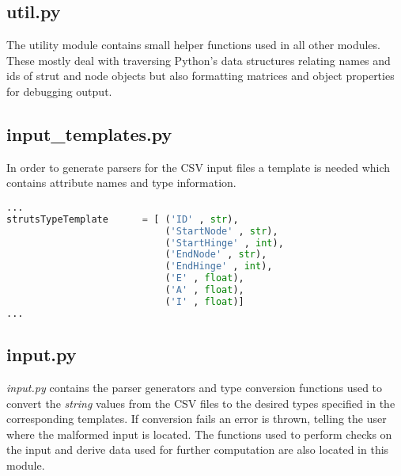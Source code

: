\subsection{util.py}
\label{subsec:util.py}

The utility module contains small helper functions used in all other modules.
These mostly deal with traversing Python's data structures relating names and ids of strut and node objects but also formatting matrices and object properties for debugging output.

\subsection{input\_templates.py}
\label{subsec:inputtemplates.py}

In order to generate parsers for the CSV input files a template is needed which contains attribute names and type information.

\begin{inconsolata}
\begin{minipage}{\linewidth}
\begin{lstlisting}[language=python]
...
strutsTypeTemplate      = [ ('ID' , str),
                            ('StartNode' , str),
                            ('StartHinge' , int),
                            ('EndNode' , str),
                            ('EndHinge' , int),
                            ('E' , float),
                            ('A' , float),
                            ('I' , float)]
...
\end{lstlisting}
\end{minipage}
\end{inconsolata}

\subsection{input.py}
\label{subsec:input.py}

\textit{input.py} contains the parser generators and type conversion functions used to convert the \textit{string} values from the CSV files to the desired types specified in the corresponding templates.
If conversion fails an error is thrown, telling the user where the malformed input is located.
The functions used to perform checks on the input and derive data used for further computation are also located in this module.

